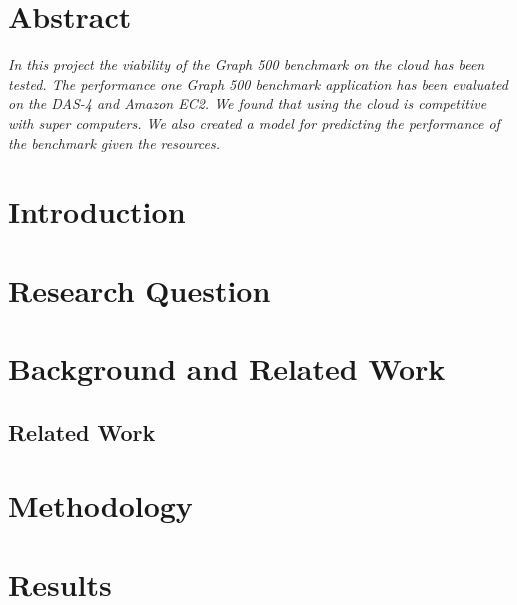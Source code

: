 \documentclass[A4]{scrartcl}
\begin{document}
\newpage

\section*{Abstract}
	\textit{In this project the viability of the Graph 500 benchmark on the cloud has been tested. The performance one Graph 500 benchmark application has been evaluated on the DAS-4 and Amazon EC2. We found that using the cloud is competitive with super computers. We also created a model for predicting the performance of the benchmark given the resources.}

\newpage

\tableofcontents
\newpage

\section{Introduction}
\label{sec:introduction}



\section{Research Question}
\label{research-questions}


%

\section{Background and Related Work}
\label{background}


\newpage
\subsection{Related Work}
\label{related-work}


\newpage
\section{Methodology}
\label{methodology}

\newpage
\section{Results}
\label{results}

\end{document}
